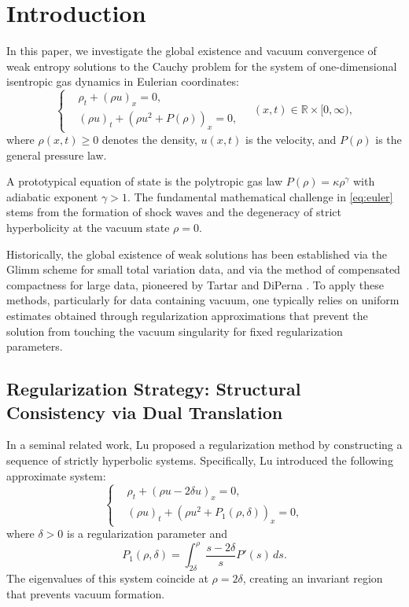 \documentclass[12pt, reqno]{article}
\theoremstyle{definition}
\newcommand{\R}{\mathbb{R}}
\numberwithin{equation}{section}
\begin{document}
\section{Introduction}
\label{sec:introduction}

In this paper, we investigate the global existence and vacuum convergence of weak entropy solutions to the Cauchy problem for the system of one-dimensional isentropic gas dynamics in Eulerian coordinates:
\begin{equation} \label{eq:euler}
\left\{
\begin{aligned}
    & \rho_t + (\rho u)_x = 0, \\
    & (\rho u)_t + (\rho u^2 + P(\rho))_x = 0,
\end{aligned}
\right. \quad (x,t) \in \R \times [0, \infty),
\end{equation}
where $\rho(x,t) \ge 0$ denotes the density, $u(x,t)$ is the velocity, and $P(\rho)$ is the general pressure law.

A prototypical equation of state is the polytropic gas law $P(\rho) = \kappa \rho^\gamma$ with adiabatic exponent $\gamma > 1$. The fundamental mathematical challenge in \eqref{eq:euler} stems from the formation of shock waves and the degeneracy of strict hyperbolicity at the vacuum state $\rho = 0$.

Historically, the global existence of weak solutions has been established via the Glimm scheme \cite{Glimm1965} for small total variation data, and via the method of compensated compactness for large data, pioneered by Tartar \cite{Tartar1979} and DiPerna \cite{DiPerna1983}. To apply these methods, particularly for data containing vacuum, one typically relies on uniform estimates obtained through regularization approximations that prevent the solution from touching the vacuum singularity for fixed regularization parameters.

\subsection{Regularization Strategy: Structural Consistency via Dual Translation}

In a seminal related work, Lu \cite{Lu2007} proposed a regularization method by constructing a sequence of strictly hyperbolic systems. Specifically, Lu introduced the following approximate system:
\begin{equation} \label{eq:Lu_system}
\left\{
\begin{aligned}
    & \rho_t + (\rho u -2\delta u)_x = 0, \\
    & (\rho u)_t + (\rho u^2 + P_1(\rho, \delta))_x = 0,
\end{aligned}
\right.
\end{equation}
where $\delta > 0$ is a regularization parameter and
\begin{equation}
    P_1(\rho, \delta) = \int_{2\delta}^{\rho} \frac{s - 2\delta}{s} P'(s) \, ds.
\end{equation}
The eigenvalues of this system coincide at $\rho = 2\delta$, creating an invariant region that prevents vacuum formation. 
\end{document}
